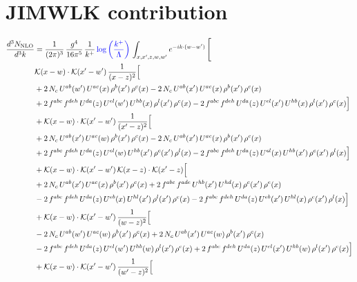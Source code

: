 \documentclass[9pt]{article}
\numberwithin{equation}{section}
\begin{document}
\section{JIMWLK contribution}
\begin{align}
\frac{d^{3}N_{\mathrm{NLO}}}{d^{3}k} & = \frac{1}{(2\pi)^{3}}\,\frac{g^{4}}{16\pi^{5}}\,\frac{1}{k^{+}}\,{\color{blue}\log{\left(\frac{k^{+}}{\Lambda}\right)}}\,\int_{x,x',z,w,w'}e^{-ik\cdot(w-w')}\,\Bigg[
\notag \\ & \mathcal{K}(x-w)\cdot\mathcal{K}(x'-w')\,\frac{1}{(x-z)^{2}}\Big[\notag\\
&+2\,N_{c}\,U^{ab}(w')\,U^{ac}(x)\,\rho^{b}(x')\,\rho^{c}(x) -2\,N_{c}\,U^{ab}(x')\,U^{ac}(x)\,\rho^{b}(x')\,\rho^{c}(x)\notag\\
& +2\,f^{abc}\,f^{deh}\,U^{da}(z)\,U^{el}(w')\,U^{hb}(x)\,\rho^{l}(x')\,\rho^{c}(x) -2\,f^{abc}\,f^{deh}\,U^{da}(z)\,U^{el}(x')\,U^{hb}(x)\,\rho^{l}(x')\,\rho^{c}(x)\Big]\notag\\
& +\mathcal{K}(x-w)\cdot\mathcal{K}(x'-w')\,\frac{1}{(x'-z)^{2}}\Big[\notag\\
& +2\,N_{c}\,U^{ab}(x')\,U^{ac}(w)\,\rho^{b}(x')\,\rho^{c}(x) -2\,N_{c}\,U^{ab}(x')\,U^{ac}(x)\,\rho^{b}(x')\,\rho^{c}(x)\notag\\
& +2\,f^{abc}\,f^{deh}\,U^{da}(z)\,U^{el}(w)\,U^{hb}(x')\,\rho^{c}(x')\,\rho^{l}(x) -2\,f^{abc}\,f^{deh}\,U^{da}(z)\,U^{el}(x)\,U^{hb}(x')\,\rho^{c}(x')\,\rho^{l}(x)\Big]\notag\\
& +\mathcal{K}(x-w)\cdot\mathcal{K}(x'-w')\,\mathcal{K}(x-z)\cdot\mathcal{K}(x'-z)\Big[\notag\\
& +2\,N_{c}\,U^{ab}(x')\,U^{ac}(x)\,\rho^{b}(x')\,\rho^{c}(x) +2\,f^{abc}\,f^{ade}\,U^{hb}(x')\,U^{hd}(x)\,\rho^{c}(x')\,\rho^{e}(x)\notag\\
& -2\,f^{abc}\,f^{deh}\,U^{da}(z)\,U^{eb}(x)\,U^{hl}(x')\,\rho^{l}(x')\,\rho^{c}(x) -2\,f^{abc}\,f^{deh}\,U^{da}(z)\,U^{eb}(x')\,U^{hl}(x)\,\rho^{c}(x')\,\rho^{l}(x)\Big]\notag\\
& +\mathcal{K}(x-w)\cdot\mathcal{K}(x'-w')\,\frac{1}{(w-z)^{2}}\Big[\notag\\
& -2\,N_{c}\,U^{ab}(w')\,U^{ac}(w)\,\rho^{b}(x')\,\rho^{c}(x) +2\,N_{c}\,U^{ab}(x')\,U^{ac}(w)\,\rho^{b}(x')\,\rho^{c}(x)\notag\\
& -2\,f^{abc}\,f^{deh}\,U^{da}(z)\,U^{el}(w')\,U^{hb}(w)\,\rho^{l}(x')\,\rho^{c}(x) +2\,f^{abc}\,f^{deh}\,U^{da}(z)\,U^{el}(x')\,U^{hb}(w)\,\rho^{l}(x')\,\rho^{c}(x)\Big]\notag\\
& +\mathcal{K}(x-w)\cdot\mathcal{K}(x'-w')\,\frac{1}{(w'-z)^{2}}\Big[\notag\\

\end{align}
\end{document}
